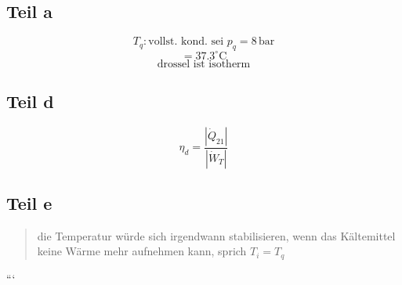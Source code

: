\subsection*{Teil a}
\[
T_q: \text{vollst. kond. sei } p_q = 8 \, \text{bar}
\]
\[
= 37.3^\circ \text{C}
\]
\[
\text{drossel ist isotherm}
\]

\subsection*{Teil d}
\[
\eta_d = \frac{\left| \dot{Q}_{21} \right|}{\left| \dot{W}_T \right|}
\]

\subsection*{Teil e}
\begin{quote}
die Temperatur würde sich irgendwann stabilisieren, wenn das Kältemittel keine Wärme mehr aufnehmen kann, sprich $T_i = T_q$
\end{quote}

```